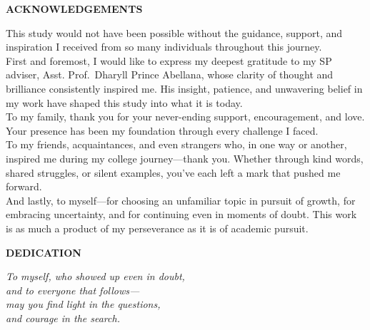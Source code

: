 \documentclass{article}
\begin{document}
\newpage

\begin{center}
\Large\textbf{ACKNOWLEDGEMENTS}
\end{center}

\vspace{1em} %

This study would not have been possible without the guidance, support, and inspiration I received from so many individuals throughout this journey. \\

First and foremost, I would like to express my deepest gratitude to my SP adviser, Asst. Prof.~Dharyll Prince Abellana, whose clarity of thought and brilliance consistently inspired me. His insight, patience, and unwavering belief in my work have shaped this study into what it is today. \\

To my family, thank you for your never-ending support, encouragement, and love. Your presence has been my foundation through every challenge I faced. \\

To my friends, acquaintances, and even strangers who, in one way or another, inspired me during my college journey—thank you. Whether through kind words, shared struggles, or silent examples, you’ve each left a mark that pushed me forward. \\

And lastly, to myself—for choosing an unfamiliar topic in pursuit of growth, for embracing uncertainty, and for continuing even in moments of doubt. This work is as much a product of my perseverance as it is of academic pursuit.




\newpage


\vfill
\begin{center}
\Large\textbf{DEDICATION}
\end{center}

\vspace{2em}

\begin{center}
\large\textit{To myself, who showed up even in doubt,\\
and to everyone that follows—\\
may you find light in the questions,\\
and courage in the search.}
\end{center}
\vfill

\newpage
\end{document}
